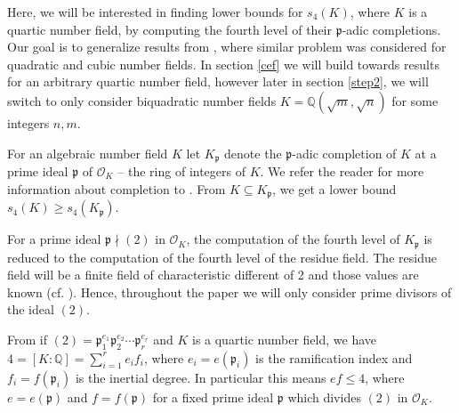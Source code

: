 \documentclass[12pt]{article}
\theoremstyle{remark}
\newcommand{\p}{\mathfrak{p}}
\newcommand{\OO}{\mathcal{O}}
\begin{document}
Here, we will be interested in finding lower bounds for $s_4(K)$, where $K$ is a quartic number field, by computing the fourth level of their $\p$-adic completions. Our goal is to generalize results from \cite{paper-per-piotr}, where similar problem was considered for quadratic and cubic number fields. In section \ref{cef} we will build towards results for an arbitrary quartic number field, however later in section \ref{step2}, we will switch to only consider biquadratic number fields $K = \mathbb{Q}(\sqrt{m},\sqrt{n})$ for some integers $n,m$. 




For an algebraic number field $K$ let $K_{\mathfrak{p}}$ denote the $\mathfrak{p}$-adic completion of $K$ at a prime ideal $\mathfrak{p}$ of $\mathcal{O}_K$ -- the ring of integers of $K$. We refer the reader for more information about completion to \cite[Chapter 7]{eisenbud1995}. From $K \subseteq K_{\mathfrak{p}}$, we get a lower bound $s_4(K) \geq s_4(K_{\mathfrak{p}})$.  












For a prime ideal $\p \nmid (2)$ in $\OO_K$, the computation of the fourth level of $K_\p$ is reduced to the computation of the fourth level of the residue field. The residue field will be a finite field of characteristic different of 2 and those values are known (cf. \cite{paper-per-piotr}). Hence, throughout the paper we will only consider prime divisors of the ideal $(2)$.









From \cite[Theorem 21]{marcus2018} if $(2) = \mathfrak{p}_1^{e_1}\mathfrak{p}_2^{e_2} \cdots \mathfrak{p}_r^{e_r}$ and $K$ is a quartic number field, we have $4 = [K : \mathbb{Q}] = \sum_{i=1}^r e_if_i$, where $e_i = e(\p_i)$ is the ramification index and $f_i = f(\p_i)$ is the inertial degree. In particular this means $ef \leq 4$, where $e=e(\mathfrak{p})$ and $f=f(\mathfrak{p})$ for a fixed prime ideal $\mathfrak{p}$ which divides $(2)$ in $\OO_K$.
\end{document}
